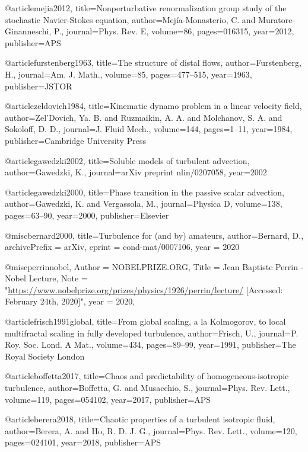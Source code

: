 @article{mejia2012,
  title={{Nonperturbative renormalization group study of the stochastic Navier-Stokes equation}},
  author={Mej{\'i}a-Mo\-nas\-te\-rio, C. and Mu\-ra\-to\-re-Gi\-nan\-nes\-chi, P.},
  journal={Phys. Rev. E},
  volume={86},
  pages={016315},
  year={2012},
  publisher={APS}
}

@article{furstenberg1963,
  title={The structure of distal flows},
  author={Furstenberg, H.},
  journal={Am. J. Math.},
  volume={85},
  pages={477--515},
  year={1963},
  publisher={JSTOR}
}

@article{zeldovich1984,
  title={Kinematic dynamo problem in a linear velocity field},
  author={Zel'Dovich, Ya. B. and Ruzmaikin, A. A. and Molchanov, S. A. and Sokoloff, D. D.},
  journal={J. Fluid Mech.},
  volume={144},
  pages={1--11},
  year={1984},
  publisher={Cambridge University Press}
}

@article{gawedzki2002,
  title={Soluble models of turbulent advection},
  author={Gawedzki, K.},
  journal={arXiv preprint nlin/0207058},
  year={2002}
}

@article{gawedzki2000,
  title={Phase transition in the passive scalar advection},
  author={Gawedzki, K. and Vergassola, M.},
  journal={Physica D},
  volume={138},
  pages={63--90},
  year={2000},
  publisher={Elsevier}
}

@misc{bernard2000,
  title={Turbulence for (and by) amateurs},
  author={Bernard, D.},
  archivePrefix = {arXiv},
  eprint        = {cond-mat/0007106},
  year = {2020}
}

@misc{perrinnobel,
  Author = {{NOBELPRIZE.ORG}},
  Title  = {Jean Baptiste Perrin - Nobel Lecture},
  Note   = "\url{https://www.nobelprize.org/prizes/physics/1926/perrin/lecture/} [Accessed: February 24th, 2020]",
  year = {2020},
}

@article{frisch1991global,
  title={{From global scaling, a la Kolmogorov, to local multifractal scaling in fully developed turbulence}},
  author={Frisch, U.},
  journal={P. Roy. Soc. Lond. A Mat.},
  volume={434},
  pages={89--99},
  year={1991},
  publisher={The Royal Society London}
}

@article{boffetta2017,
  title={Chaos and predictability of homogeneous-isotropic turbulence},
  author={Boffetta, G. and Musacchio, S.},
  journal={Phys. Rev. Lett.},
  volume={119},
  pages={054102},
  year={2017},
  publisher={APS}
}

@article{berera2018,
  title={Chaotic properties of a turbulent isotropic fluid},
  author={Berera, A. and Ho, R. D. J. G.},
  journal={Phys. Rev. Lett.},
  volume={120},
  pages={024101},
  year={2018},
  publisher={APS}
}

